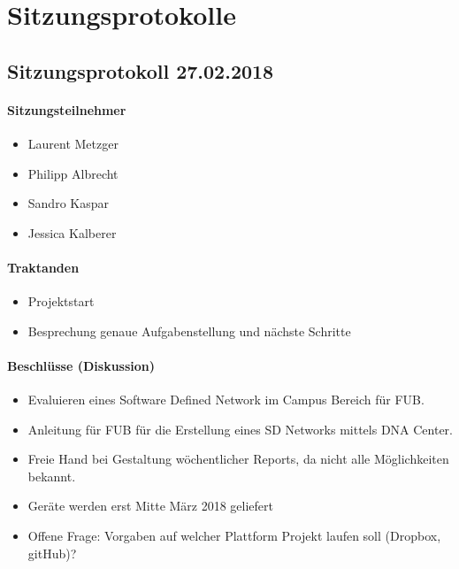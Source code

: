 \section{Sitzungsprotokolle}
%

\subsection{Sitzungsprotokoll 27.02.2018}

\paragraph{Sitzungsteilnehmer}
\begin{itemize}	
	\item Laurent Metzger 
	\item Philipp Albrecht
	\item Sandro Kaspar
	\item Jessica Kalberer
\end{itemize}

\paragraph{Traktanden}
\begin{itemize}	
	\item Projektstart
	\item Besprechung genaue Aufgabenstellung und nächste Schritte
\end{itemize}

\paragraph{Beschlüsse (Diskussion)}
\begin{itemize}	
	\item Evaluieren eines Software Defined Network im Campus Bereich für FUB.
	\item Anleitung für FUB für die Erstellung eines SD Networks mittels DNA Center.
	\item Freie Hand bei Gestaltung wöchentlicher Reports, da nicht alle Möglichkeiten bekannt.
	\item Geräte werden erst Mitte März 2018 geliefert
	\item Offene Frage: Vorgaben auf welcher Plattform Projekt laufen soll (Dropbox, gitHub)?
\end{itemize}

